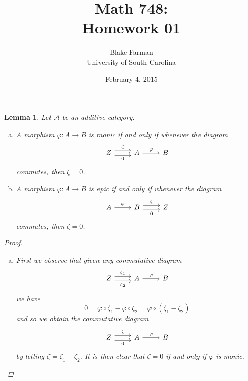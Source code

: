 \documentclass[10pt]{amsart}
\author{Blake Farman\\University of South Carolina}
\title{Math 748:\\Homework 01}
\date{February 4, 2015}
\begin{document}
\maketitle

\providecommand{\p}{\mathfrak{p}}
\providecommand{\m}{\mathfrak{m}}
\providecommand{\Deck}[1]{\operatorname{Deck}\left(#1\right)}
\newtheorem{thm}{Theorem}
\newtheorem{ex}{}
\newtheorem{lem}{Lemma}
\newtheorem{prop}{Proposition}
\theoremstyle{definition}
\newtheorem{defn}{Definition}

\newcommand{\A}{\mathbb{A}}

\begin{lem}\label{lem1}
  Let $\mathcal{A}$ be an additive category.
  \begin{enumerate}[(a)]
  \item
    A morphism $\varphi: A \rightarrow B$ is monic if and only if whenever the diagram
    $$\begin{tikzcd}
      Z \arrow[shift left = 0.75ex]{r}{\zeta} \arrow[shift right=0.75ex, swap]{r}{0}& A\arrow{r}{\varphi} & B
    \end{tikzcd}
    $$
    commutes, then $\zeta = 0$.
  \item
    A morphism $\varphi: A \rightarrow B$ is epic if and only if whenever the diagram
    $$\begin{tikzcd}
      A\arrow{r}{\varphi} & B \arrow[shift left = 0.75ex]{r}{\zeta} \arrow[shift right=0.75ex, swap]{r}{0} & Z
    \end{tikzcd}
    $$
    commutes, then $\zeta = 0$.
  \end{enumerate}
  \begin{proof}
    \begin{enumerate}[(a)]
    \item
      First we observe that given any commutative diagram
      $$\begin{tikzcd}
	Z \arrow[shift left = 0.75ex]{r}{\zeta_1} \arrow[shift right=0.75ex, swap]{r}{\zeta_2}& A\arrow{r}{\varphi} & B
      \end{tikzcd}$$
      we have
      $$0 = \varphi \circ \zeta_1 - \varphi \circ \zeta_2 = \varphi \circ (\zeta_1 - \zeta_2)$$
      and so we obtain the commutative diagram
      $$\begin{tikzcd}
	Z \arrow[shift left = 0.75ex]{r}{\zeta} \arrow[shift right=0.75ex, swap]{r}{0}& A\arrow{r}{\varphi} & B
      \end{tikzcd}$$
      by letting $\zeta = \zeta_1 - \zeta_2$.
      It is then clear that $\zeta = 0$ if and only if $\varphi$ is monic.

\end{enumerate}
\end{proof}
\end{lem}
\end{document}
